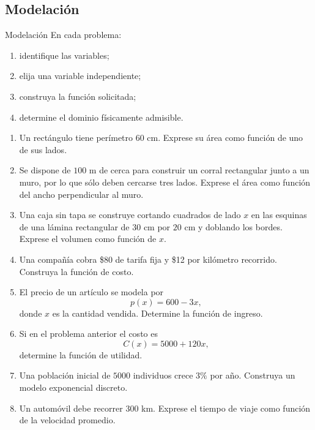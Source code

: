 \documentclass[aspectratio=169,10pt]{beamer}
\begin{document}
\subsection{Modelación}
\begin{frame}{Modelación}
En cada problema:
\begin{enumerate}
    \item identifique las variables;
    \item elija una variable independiente;
    \item construya la función solicitada;
    \item determine el dominio físicamente admisible.
\end{enumerate}

\begin{enumerate}
    \item Un rectángulo tiene perímetro $60$ cm. Exprese su área como función
    de uno de sus lados.

    \item Se dispone de $100$ m de cerca para construir un corral rectangular
    junto a un muro, por lo que sólo deben cercarse tres lados. Exprese el área
    como función del ancho perpendicular al muro.

    \item Una caja sin tapa se construye cortando cuadrados de lado $x$ en las
    esquinas de una lámina rectangular de $30$ cm por $20$ cm y doblando los
    bordes. Exprese el volumen como función de $x$.

    \item Una compañía cobra \$80 de tarifa fija y \$12 por kilómetro recorrido.
    Construya la función de costo.

    \item El precio de un artículo se modela por
    \[
    p(x)=600-3x,
    \]
    donde $x$ es la cantidad vendida. Determine la función de ingreso.

    \item Si en el problema anterior el costo es
    \[
    C(x)=5000+120x,
    \]
    determine la función de utilidad.

    \item Una población inicial de $5000$ individuos crece $3\%$ por año.
    Construya un modelo exponencial discreto.

    \item Un automóvil debe recorrer $300$ km. Exprese el tiempo de viaje como
    función de la velocidad promedio.
\end{enumerate}
\end{frame}
\end{document}
